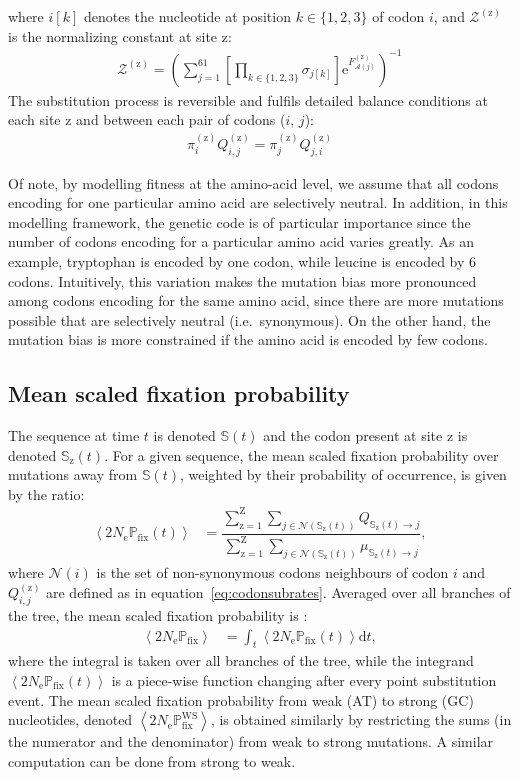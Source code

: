 \documentclass{article}
\newcommand{\der}{\mathrm{d}} %
\newcommand{\e}{\text{e}} %
\newcommand{\Ne}{N_{\text{e}}} %
\newcommand{\proba}{\mathbb{P}} %
\newcommand{\Pfix}{2 \Ne \proba_{\text{fix}}} %
\newcommand{\mutequi}{\sigma} %
\newcommand{\ci}{{i}} %
\newcommand{\cj}{{j}} %
\newcommand{\itoj}{\ci, \cj} %
\newcommand{\submatrix}{Q} %
\newcommand{\subequi}{\pi} %
\newcommand{\aaMap}{\mathcal{A}} %
\newcommand{\aaj}{\aaMap(\cj)} %
\newcommand{\avgpfix}{\left\langle \Pfix \right\rangle } %
\newcommand{\avgpfixATtoGC}{\left\langle \Pfix^{\text{WS}} \right\rangle } %
\newcommand{\avgpfixtime}{\left\langle \Pfix (t) \right\rangle } %
\newcommand{\scaledfit}{F} %
\newcommand{\Fitj}{\scaledfit_{\aaj}} %
\newcommand{\site}{\text{z}} %
\newcommand{\Nsite}{\text{Z}} %
\newcommand{\siteexp}{^{(\site)}} %
\newcommand{\sumSetsite}{_{\site=1}^{\Nsite} } %
\newcommand{\Seqi}{\mathbb{S}} %
\newcommand{\NonSynNeighbors}{\mathcal{N}} %
\newcommand{\setNonSynNeighbors}{\NonSynNeighbors\left(\ci\right)} %
\begin{document}
where $\ci[k]$ denotes the nucleotide at position $k \in \{ 1, 2, 3 \}$ of codon $\ci$, and $\mathcal{Z}\siteexp $ is the normalizing constant at site $\site$:
\begin{align}
 \mathcal{Z}\siteexp = \left( \sum\limits_{\cj=1}^{61} \left[\prod\limits_{k \in \{ 1, 2, 3 \}} \mutequi_{\cj[k]}\right] \e^{\Fitj\siteexp} \right)^{-1}
\end{align}
The {substitution} process is reversible and fulfils detailed balance conditions at each site $\site$ and between each pair of codons ($\ci$, $\cj$):
\begin{align}
 \subequi_{\ci}\siteexp \submatrix_{\itoj}\siteexp = \subequi_{\cj}\siteexp \submatrix_{\cj, \ci}\siteexp
 \label{codonSubBalance}
\end{align}

Of note, by modelling fitness at the amino-acid level, we assume that all codons encoding for one particular amino acid are selectively {neutral}.
In addition, in this modelling framework, the genetic code is of particular importance since the number of codons encoding for a particular amino acid varies greatly.
As an example, tryptophan is encoded by one codon, while leucine is encoded by 6 codons.
Intuitively, this variation makes the mutation bias more pronounced among codons encoding for the same amino acid, since there are more mutations possible that are selectively {neutral} (i.e.~synonymous).
On the other hand, the mutation bias is more constrained if the amino acid is encoded by few codons.

\subsection{Mean scaled fixation probability}
\label{subsec:fixation-bias}
The sequence at time $t$ is denoted $\Seqi(t)$ and the codon present at site $\site$ is denoted $\Seqi_{\site}(t)$.
For a given sequence, the mean scaled fixation probability over mutations away from $\Seqi(t)$, weighted by their probability of occurrence, is given by the ratio:
\begin{align}
 \avgpfixtime & = \dfrac{ \sum\limits\sumSetsite \sum\limits_{\cj \in \NonSynNeighbors \left ( \Seqi_{\site}(t) \right)} Q_{\Seqi_{\site}(t) \to \cj}}{ \sum\limits\sumSetsite \sum\limits_{\cj \in \NonSynNeighbors \left ( \Seqi_{\site}(t) \right)} \mu_{\Seqi_{\site}(t) \to \cj}},
\end{align}
where $\setNonSynNeighbors$ is the set of {non-synonymous} codons neighbours of codon $\ci$ and $\submatrix_{\itoj}\siteexp$ are defined as in equation~\ref{eq:codonsubrates}.
Averaged over all branches of the tree, the mean scaled fixation probability is :
\begin{align}
 \avgpfix & = \int_{t} \avgpfixtime \der t,
\end{align}
where the integral is taken over all branches of the tree, while the integrand $\avgpfixtime$ is a piece-wise function changing after every point {substitution} event.
The mean scaled fixation probability from weak (AT) to strong (GC) nucleotides, denoted $\avgpfixATtoGC$, is obtained similarly by restricting the sums (in the numerator and the denominator) from weak to strong mutations.
A similar computation can be done from strong to weak.
\end{document}
